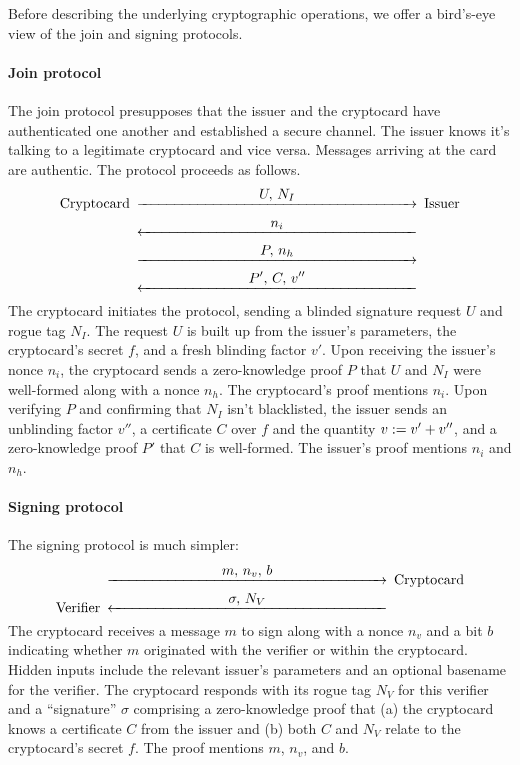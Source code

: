 Before describing the underlying cryptographic operations,
we offer a bird's-eye view of the join and signing protocols.

\paragraph*{Join protocol}
The join protocol presupposes that the issuer and the cryptocard
have authenticated one another and established a secure
channel. The issuer knows it's talking to a legitimate
cryptocard and vice versa. Messages arriving at the card are
authentic. The protocol proceeds as follows.
\[
	\minCDarrowwidth200pt
	\begin{CD}
	\text{Cryptocard}	@>{\displaystyle U,\, N_I}>>	\text{Issuer} \\
	{}	@<{\displaystyle n_i}<<	{} \\
	{}	@>{\displaystyle P,\, n_h}>>	{} \\
	{}	@<{\displaystyle P',\, C,\, v''}<<	{}
	\end{CD}
\]
The cryptocard initiates the protocol, sending a blinded
signature request $U$ and rogue tag $N_I$.
The request $U$ is built up from the issuer's parameters,
the cryptocard's secret $f$, and
a fresh blinding factor $v'$.
Upon receiving the issuer's nonce $n_i$, the cryptocard
sends a zero-knowledge proof $P$ that
$U$ and $N_I$ were well-formed along with a nonce $n_h$.
The cryptocard's proof mentions $n_i$.
Upon verifying $P$ and confirming that $N_I$ isn't blacklisted, the
issuer sends an unblinding factor $v''$, a certificate $C$ over
$f$ and the quantity $v \mathrel{:=} v'+v''$, and a zero-knowledge proof
$P'$ that $C$ is well-formed.
The issuer's proof mentions $n_i$ and $n_h$.

\paragraph*{Signing protocol}
The signing protocol is much simpler:
\[
	\minCDarrowwidth200pt
	\begin{CD}
	{}	@>{\displaystyle m,\, n_v,\, b}>>	\text{Cryptocard} \\
	\text{Verifier}	@<{\displaystyle \sigma,\, N_V}<<	{} \\
	\end{CD}
\]
The cryptocard receives a message $m$ to sign along
with a nonce $n_v$ and
a bit $b$ indicating whether $m$ originated with the verifier or within the cryptocard.
Hidden inputs include the relevant issuer's parameters and an optional
basename for the verifier.
The cryptocard responds with its rogue tag $N_V$ for this verifier
and a ``signature'' $\sigma$ comprising
a zero-knowledge proof that (a) the cryptocard knows a certificate $C$
from the issuer and (b) both $C$ and $N_V$ relate to the cryptocard's secret $f$.
The proof mentions $m$, $n_v$, and $b$.
